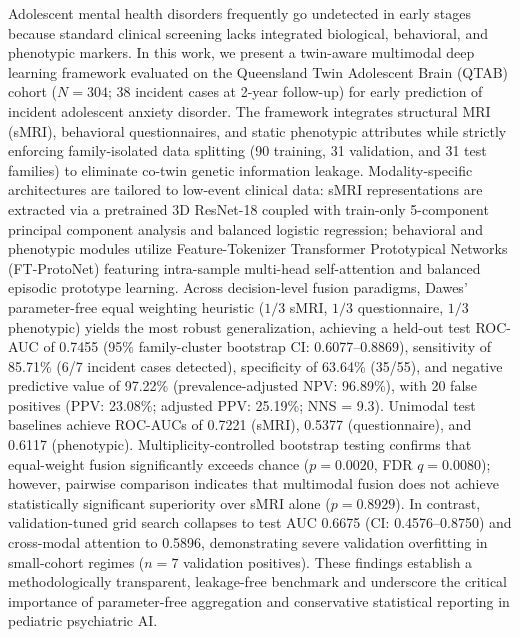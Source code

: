 \documentclass[10pt,letterpaper]{article}
\begin{document}
Adolescent mental health disorders frequently go undetected in early stages because standard clinical screening lacks integrated biological, behavioral, and phenotypic markers. In this work, we present a twin-aware multimodal deep learning framework evaluated on the Queensland Twin Adolescent Brain (QTAB) cohort ($N=304$; 38 incident cases at 2-year follow-up) for early prediction of incident adolescent anxiety disorder. The framework integrates structural MRI (sMRI), behavioral questionnaires, and static phenotypic attributes while strictly enforcing family-isolated data splitting (90 training, 31 validation, and 31 test families) to eliminate co-twin genetic information leakage. Modality-specific architectures are tailored to low-event clinical data: sMRI representations are extracted via a pretrained 3D ResNet-18 coupled with train-only 5-component principal component analysis and balanced logistic regression; behavioral and phenotypic modules utilize Feature-Tokenizer Transformer Prototypical Networks (FT-ProtoNet) featuring intra-sample multi-head self-attention and balanced episodic prototype learning. Across decision-level fusion paradigms, Dawes' parameter-free equal weighting heuristic ($1/3$ sMRI, $1/3$ questionnaire, $1/3$ phenotypic) yields the most robust generalization, achieving a held-out test ROC-AUC of 0.7455 (95\% family-cluster bootstrap CI: 0.6077--0.8869), sensitivity of 85.71\% (6/7 incident cases detected), specificity of 63.64\% (35/55), and negative predictive value of 97.22\% (prevalence-adjusted NPV: 96.89\%), with 20 false positives (PPV: 23.08\%; adjusted PPV: 25.19\%; NNS = 9.3). Unimodal test baselines achieve ROC-AUCs of 0.7221 (sMRI), 0.5377 (questionnaire), and 0.6117 (phenotypic). Multiplicity-controlled bootstrap testing confirms that equal-weight fusion significantly exceeds chance ($p = 0.0020$, FDR $q = 0.0080$); however, pairwise comparison indicates that multimodal fusion does not achieve statistically significant superiority over sMRI alone ($p = 0.8929$). In contrast, validation-tuned grid search collapses to test AUC 0.6675 (CI: 0.4576--0.8750) and cross-modal attention to 0.5896, demonstrating severe validation overfitting in small-cohort regimes ($n=7$ validation positives). These findings establish a methodologically transparent, leakage-free benchmark and underscore the critical importance of parameter-free aggregation and conservative statistical reporting in pediatric psychiatric AI.

\end{document}
